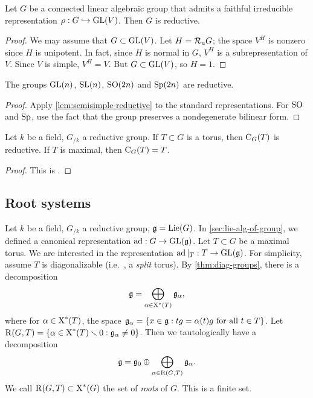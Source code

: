 \begin{lemma}\label{lem:semisimple-reductive}
Let $G$ be a connected linear algebraic group that admits a faithful 
irreducible representation $\rho:G\hookrightarrow \operatorname{GL}(V)$. Then $G$ is reductive. 
\end{lemma}
\begin{proof}
We may assume that $G\subset \operatorname{GL}(V)$. Let $H=\mathcal{R}_\mathrm{u} G$; the space $V^H$ is 
nonzero since $H$ is unipotent. In fact, since $H$ is normal in $G$, 
$V^H$ is a subrepresentation of $V$. Since $V$ is simple, $V^H=V$. But 
$G\subset \operatorname{GL}(V)$, so $H=1$. 
\end{proof}

\begin{corollary}
The groups $\operatorname{GL}(n)$, $\operatorname{SL}(n)$, $\operatorname{SO}(2n)$ and $\operatorname{Sp}(2n)$ are reductive. 
\end{corollary}
\begin{proof}
Apply \autoref{lem:semisimple-reductive} to the standard representations. For 
$\operatorname{SO}$ and $\operatorname{Sp}$, use the fact that the group preserves a nondegenerate bilinear 
form. 
\end{proof}

\begin{theorem}\label{thm:centralizer-reductive}
Let $k$ be a field, $G_{/k}$ a reductive group. If $T\subset G$ is a torus, 
then $\operatorname{C}_G(T)$ is reductive. If $T$ is maximal, then 
$\operatorname{C}_G(T)=T$. 
\end{theorem}
\begin{proof}
This is \cite[XIX 1.6]{sga3-iii}. 
\end{proof}





\subsection{Root systems}

Let $k$ be a field, $G_{/k}$ a reductive group, $\mathfrak{g}=\operatorname{Lie}(G)$. In 
\autoref{sec:lie-alg-of-group}, we defined a canonical representation 
$\operatorname{ad}:G\to \operatorname{GL}(\mathfrak{g})$. Let $T\subset G$ be a maximal torus. We are 
interested in the representation $\operatorname{ad}|_T:T\to \operatorname{GL}(\mathfrak{g})$. For simplicity, 
assume $T$ is diagonalizable (i.e.~, a \emph{split} torus). By 
\autoref{thm:diag-groups}, there is a decomposition 
\[
  \mathfrak{g} = \bigoplus_{\alpha\in\operatorname{X}^\ast(T)} \mathfrak{g}_\alpha ,
\]
where for $\alpha\in \operatorname{X}^\ast(T)$, the space 
$\mathfrak{g}_\alpha=\{x\in \mathfrak{g}:t g=\alpha(t) g\text{ for all }t\in T\}$. Let 
$\operatorname{R}(G,T) = \{\alpha\in \operatorname{X}^\ast(T)\smallsetminus 0:\mathfrak{g}_\alpha\ne 0\}$. 
Then we tautologically have a decomposition 
\[
  \mathfrak{g}=\mathfrak{g}_0\oplus \bigoplus_{\alpha\in \operatorname{R}(G,T)} \mathfrak{g}_\alpha .
\]
We call $\operatorname{R}(G,T)\subset \operatorname{X}^\ast(G)$ the set of \emph{roots} of 
$G$. This is a finite set. 

